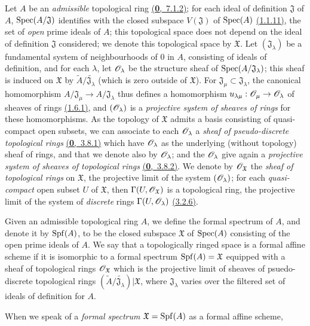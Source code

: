 \begin{env}[10.1.1]
\label{env-1.10.1.1}
Let $A$ be an {\em admissible} topological ring \hyperref[defn-0.7.1.2]{(\textbf{0},~7.1.2)}; for each
ideal of definition $\mathfrak{J}$ of $A$, ${\mathop{\mathrm{Spec}}\nolimits}(A/\mathfrak{J})$ identifies
with the closed subspace $V(\mathfrak{J})$ of ${\mathop{\mathrm{Spec}}\nolimits}(A)$ \hyperref[prop-1.1.1.11]{(1.1.11)},
the set of {\em open} prime ideals of $A$; this topological space does not depend
on the ideal of definition $\mathfrak{J}$ considered; we denote this topological
space by $\mathfrak{X}$. Let $(\mathfrak{J}_\lambda)$ be a fundamental system
of neighbourhoods of $0$ in $A$, consisting of ideals of definition, and for each
$\lambda$, let $\mathscr{O}_\lambda$ be the structure sheaf of
${\mathop{\mathrm{Spec}}\nolimits}(A/\mathfrak{J}_\lambda)$; this sheaf is induced on $\mathfrak{X}$ by
$\widetilde{A}/\widetilde{\mathfrak{J}_\lambda}$ (which is zero outside of
$\mathfrak{X}$). For $\mathfrak{J}_\mu\subset\mathfrak{J}_\lambda$, the
canonical homomorphism $A/\mathfrak{J}_\mu\to A/\mathfrak{J}_\lambda$ thus
defines a homomorphism $u_{\lambda\mu}:\mathscr{O}_\mu\to\mathscr{O}_\lambda$ of sheaves of
rings \hyperref[env-1.1.6.1]{(1.6.1)}, and $(\mathscr{O}_\lambda)$ is a {\em projective system of
sheaves of rings} for these homomorphisms. As the topology of $\mathfrak{X}$
admits a basis consisting of quasi-compact open subsets, we can associate to
each $\mathscr{O}_\lambda$ a {\em sheaf of pseudo-discrete topological rings}
\hyperref[env-0.3.8.1]{(\textbf{0},~3.8.1)} which have $\mathscr{O}_\lambda$ as the underlying (without topology)
sheaf of rings, and that we denote also by $\mathscr{O}_\lambda$; and the $\mathscr{O}_\lambda$ give again a
{\em projective system of sheaves of topological rings} \hyperref[env-0.3.8.2]{(\textbf{0},~3.8.2)}.
We denote by $\mathscr{O}_\mathfrak{X}$ the {\em sheaf of topological rings} on $\mathfrak{X}$, the
projective limit of the system $(\mathscr{O}_\lambda)$; for each {\em quasi-compact} open subset $U$
of $\mathfrak{X}$, then $\Gamma(U,\mathscr{O}_\mathfrak{X})$ is a topological ring, the projective
limit of the system of {\em discrete} rings $\Gamma(U,\mathscr{O}_\lambda)$
\hyperref[env-0.3.2.6]{(3.2.6)}.
\end{env}

\begin{defn}[10.1.2]
\label{defn-1.10.1.2}
Given an admissible topological ring $A$, we define the formal spectrum of $A$, and denote
it by ${\mathop{\mathrm{Spf}}\nolimits}(A)$, to be the closed subspace $\mathfrak{X}$ of ${\mathop{\mathrm{Spec}}\nolimits}(A)$ consisting of the
open prime ideals of $A$. We say that a topologically ringed space is a formal affine scheme
if it is isomorphic to a formal spectrum ${\mathop{\mathrm{Spf}}\nolimits}(A)=\mathfrak{X}$ equipped with a sheaf of
topological rings $\mathscr{O}_\mathfrak{X}$ which is the projective limit of sheaves of
psuedo-discrete topological rings
$(\widetilde{A}/\widetilde{\mathfrak{J}_\lambda})|\mathfrak{X}$, where $\mathfrak{J}_\lambda$
varies over the filtered set of ideals of definition for $A$.
\end{defn}

When we speak of a {\em formal spectrum $\mathfrak{X}={\mathop{\mathrm{Spf}}\nolimits}(A)$} as a formal affine scheme,






